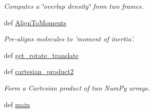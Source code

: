 \begin{DoxyCompactItemize}
\begin{DoxyCompactList}\small\item\em \-Computes a \char`\"{}overlap density\char`\"{} from two frames. \end{DoxyCompactList}\item 
def \hyperlink{namespaceforcebalance_1_1molecule_aa9ad9b92efa7bd3c1d589d62bbb8108e}{\-Align\-To\-Moments}
\begin{DoxyCompactList}\small\item\em \-Pre-\/aligns molecules to 'moment of inertia'. \end{DoxyCompactList}\item 
def \hyperlink{namespaceforcebalance_1_1molecule_a08840b73e95bf34bf9ca7ea36ad0492d}{get\-\_\-rotate\-\_\-translate}
\item 
def \hyperlink{namespaceforcebalance_1_1molecule_ae76fc5d05f43acc6006a4d1733818d71}{cartesian\-\_\-product2}
\begin{DoxyCompactList}\small\item\em \-Form a \-Cartesian product of two \-Num\-Py arrays. \end{DoxyCompactList}\item 
def \hyperlink{namespaceforcebalance_1_1molecule_ab9cb167fbbd809aedcf8c7434d405547}{main}
\end{DoxyCompactItemize}
